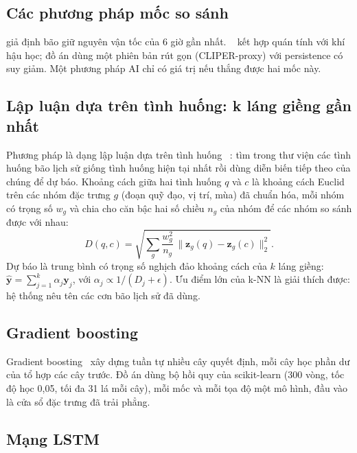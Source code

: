\subsection{Các phương pháp mốc so sánh}

 giả định bão giữ nguyên vận tốc của 6 giờ gần nhất.
 ~\cite{Neumann1972} kết hợp quán
tính với khí hậu học; đồ án dùng một phiên bản rút gọn (CLIPER-proxy) với
persistence có suy giảm. Một phương pháp AI chỉ có giá trị nếu thắng được hai
mốc này.

\subsection{Lập luận dựa trên tình huống: k láng giềng gần nhất}

Phương pháp  là dạng lập luận dựa trên tình huống
~\cite{RussellNorvig2021}: tìm trong thư viện các
tình huống bão lịch sử giống tình huống hiện tại nhất rồi dùng diễn biến tiếp
theo của chúng để dự báo. Khoảng cách giữa hai tình huống $q$ và $c$ là khoảng
cách Euclid trên các nhóm đặc trưng $g$ (đoạn quỹ đạo, vị trí, mùa) đã chuẩn
hóa, mỗi nhóm có trọng số $w_g$ và chia cho căn bậc hai số chiều $n_g$ của nhóm
để các nhóm so sánh được với nhau:
\begin{equation}
D(q, c) = \sqrt{\sum_{g} \frac{w_g^2}{n_g} \,\bigl\lVert \mathbf{z}_g(q) - \mathbf{z}_g(c) \bigr\rVert_2^2} .
\label{eq:knn-dist}
\end{equation}
Dự báo là trung bình có trọng số nghịch đảo khoảng cách của $k$ láng giềng:
$\hat{\mathbf{y}} = \sum_{j=1}^{k} \alpha_j \mathbf{y}_j$, với
$\alpha_j \propto 1 / (D_j + \epsilon)$. Ưu điểm lớn của k-NN là giải thích
được: hệ thống nêu tên các cơn bão lịch sử đã dùng.

\subsection{Gradient boosting}

Gradient boosting~\cite{Friedman2001} xây dựng tuần tự nhiều cây quyết định,
mỗi cây học phần dư của tổ hợp các cây trước. Đồ án dùng bộ hồi quy
 của scikit-learn (300 vòng, tốc độ học 0,05,
tối đa 31 lá mỗi cây), mỗi mốc và mỗi tọa độ một mô hình, đầu vào là cửa sổ
đặc trưng đã trải phẳng.

\subsection{Mạng LSTM}

